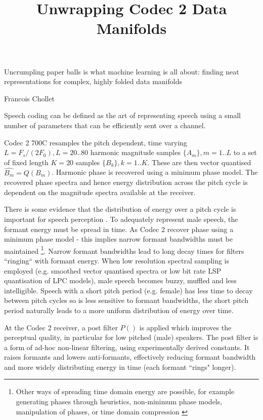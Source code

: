 \documentclass{article}
\begin{document}
\title{Unwrapping Codec 2 Data Manifolds}
\maketitle

\epigraph{Uncrumpling paper balls is what machine learning is all about: finding neat representations for complex, highly folded data manifolds}{Francois Chollet \cite{chollet2018deep}}

Speech coding can be defined as the art of representing speech using a small number of parameters that can be efficiently sent over a channel.

Codec 2 700C resamples the pitch dependent, time varying $L=F_s/(2F_0), L=20..80$ harmonic magnitude samples $\{A_m\}, m=1..L$ to a set of fixed length $K=20$ samples $\{B_k\},k=1..K$.  These are then vector quantised $\hat{B_m}=Q(B_m)$.  Harmonic phase is recovered using a minimum phase model. The recovered phase spectra and hence energy distribution across the pitch cycle is dependent on the magnitude spectra available at the receiver.

There is some evidence that the distribution of energy over a pitch cycle is important for speech perception \cite{rowe2023_ratek_study}. To adequately represent male speech, the formant energy must be spread in time.  As Codec 2 recover phase using a minimum phase model - this implies narrow formant bandwidths must be maintained \footnote{Other ways of spreading time domain energy are possible, for example generating phases through heuristics, non-minimum phase models, manipulation of phases, or time domain compression \cite{rowe2023_ratek_study}}.  Narrow formant bandwidths lead to long decay times for filters ``ringing`` with formant energy. When low resolution spectral sampling is employed (e.g. smoothed vector quantised spectra or low bit rate LSP quantisation of LPC models), male speech becomes buzzy, muffled and less intelligible.  Speech with a short pitch period (e.g. female) has less time to decay between pitch cycles so is less sensitive to formant bandwidths, the short pitch period naturally leads to a more uniform distribution of energy over time.

At the Codec 2 receiver, a post filter $P()$ is applied which improves the perceptual quality, in particular for low pitched (male) speakers. The post filter is a form of ad-hoc non-linear filtering, using experimentally derived constants.  It raises formants and lowers anti-formants, effectively reducing formant bandwidth and more widely distributing energy in time (each formant ``rings" longer).
\end{document}
